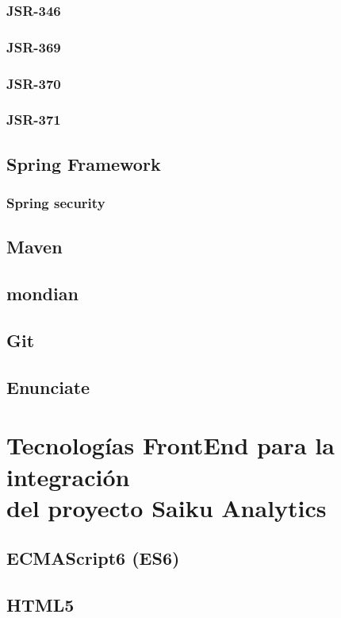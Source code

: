 		\subsubsection{JSR-346}
				\lipsum[1-2]
		\subsubsection{JSR-369}
				\lipsum[1-2]
		\subsubsection{JSR-370}
		\lipsum[1-2]
		\subsubsection{JSR-371}
		\lipsum[1-2]
	\subsection{Spring Framework}
			\lipsum[1-2]
		\subsubsection{Spring security}
				\lipsum[1-2]
	\subsection{Maven}
			\lipsum[1-2]
	\subsection{mondian}
			\lipsum[1-2]
	\subsection{Git}
			\lipsum[1-2]
	\subsection{Enunciate}
			\lipsum[1-2]
\section{Tecnolog\'{i}as FrontEnd para la integraci\'{o}n\\
		 del proyecto Saiku Analytics}
		\lipsum[1-2]
	\subsection{ECMAScript6 (ES6)}
			\lipsum[1-2]
	\subsection{HTML5}
			\lipsum[1-2]
